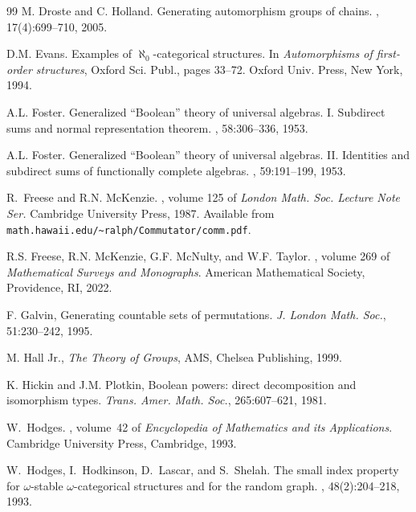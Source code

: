 \documentclass[12pt,a4paper,reqno]{amsart}
\numberwithin{equation}{section}
\theoremstyle{plain}
\theoremstyle{definition}
\begin{document}
\begin{thebibliography}{99}
M. Droste and C. Holland.
\newblock Generating automorphism groups of chains.
, 17(4):699--710, 2005.

D.M. Evans.
\newblock Examples of {$\aleph_0$}-categorical structures.
\newblock In {\em Automorphisms of first-order structures}, Oxford Sci. Publ.,
  pages 33--72. Oxford Univ. Press, New York, 1994.

 A.L. Foster.
 \newblock Generalized ``{B}oolean'' theory of universal algebras. {I}.
   {S}ubdirect sums and normal representation theorem.
 , 58:306--336, 1953.

A.L. Foster.
\newblock Generalized ``{B}oolean'' theory of universal algebras. {II}.
  {I}dentities and subdirect sums of functionally complete algebras.
, 59:191--199, 1953.

R.~Freese and R.N. McKenzie.
, volume 125
  of {\em London Math. Soc. Lecture Note Ser.}
\newblock Cambridge University Press, 1987.
\newblock Available from
  \verb+math.hawaii.edu/~ralph/Commutator/comm.pdf+.

R.S. Freese, R.N. McKenzie, G.F. McNulty, and W.F. Taylor.
, volume 269 of {\em
  Mathematical Surveys and Monographs}.
\newblock American Mathematical Society, Providence, RI, 2022.
  
  
  F. Galvin, Generating countable sets of permutations. 
  {\em J. London Math. Soc.}, 51:230--242, 1995.
  
  M. Hall Jr., {\it The Theory of Groups}, AMS, Chelsea Publishing, 1999.

K. Hickin and J.M. Plotkin, Boolean powers: direct decomposition and isomorphism
types. {\em Trans. Amer. Math. Soc.}, 265:607--621, 1981.

W.~Hodges.
, volume~42 of {\em Encyclopedia of Mathematics and
  its Applications}.
\newblock Cambridge University Press, Cambridge, 1993.

W.~Hodges, I.~Hodkinson, D.~Lascar, and S.~Shelah.
\newblock The small index property for {$\omega$}-stable {$\omega$}-categorical
  structures and for the random graph.
, 48(2):204--218, 1993.


\end{thebibliography}
\end{document}
